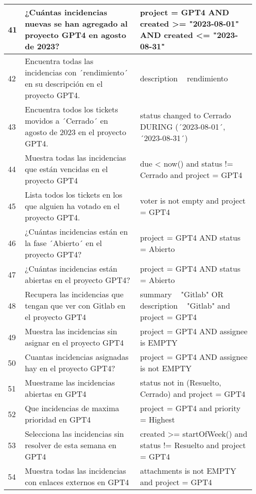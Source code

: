 \begin{center}
\begin{longtable}{ | p{1cm} | p{8cm} | p{6cm} | }
        \hline
        41 & ¿Cuántas incidencias nuevas se han agregado al proyecto GPT4 en agosto de 2023? & project = GPT4 AND created >= "2023-08-01" AND created <= "2023-08-31" \\
        \hline
        42 & Encuentra todas las incidencias con ´rendimiento´ en su descripción en el proyecto GPT4. & description ~ rendimiento \\
        \hline
        43 & Encuentra todos los tickets movidos a ´Cerrado´ en agosto de 2023 en el proyecto GPT4. & status changed to Cerrado DURING (´2023-08-01´, ´2023-08-31´) \\
        \hline
        44 & Muestra todas las incidencias que están vencidas en el proyecto GPT4 & due < now() and status != Cerrado and project = GPT4 \\
        \hline
        45 & Lista todos los tickets en los que alguien ha votado en el proyecto GPT4. & voter is not empty and project = GPT4 \\
        \hline
        46 & ¿Cuántas incidencias están en la fase ´Abierto´ en el proyecto GPT4? & project = GPT4 AND status = Abierto \\
        \hline
        47 & ¿Cuántas incidencias están abiertas en el proyecto GPT4? & project = GPT4 AND status = Abierto \\
        \hline
        48 & Recupera las incidencias que tengan que ver con Gitlab en el proyecto GPT4 & summary ~ "Gitlab" OR description ~ "Gitlab" and project = GPT4  \\
        \hline
        49 & Muestra las incidencias sin asignar en el proyecto GPT4 & project = GPT4 AND assignee is EMPTY \\
        \hline
        50 & Cuantas incidencias asignadas hay en el proyecto GPT4? & project = GPT4 AND assignee is not EMPTY \\
        \hline
        51 & Muestrame las incidencias abiertas en GPT4 & status not in (Resuelto, Cerrado) and project = GPT4 \\
        \hline
        52 & Que incidencias de maxima prioridad en GPT4 & project = GPT4 and priority = Highest \\
        \hline
        53 & Selecciona las incidencias sin resolver de esta semana en GPT4 & created >= startOfWeek() and status != Resuelto and project = GPT4 \\
        \hline
        54 & Muestra todas las incidencias con enlaces externos en GPT4 & attachments is not EMPTY and project = GPT4 \\

\end{longtable}
\end{center}
